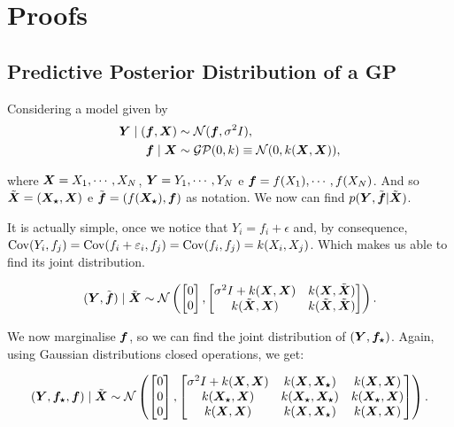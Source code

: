 \section{Proofs}
\label{proof:pred}

\subsection{Predictive Posterior Distribution of a GP}

Considering a model given by
    \begin{align*}
        \bfY \mid (\bff, \bfX) &\sim \cN(\bff, \sigma^2 I),\\
        \bff \mid \bfX &\sim \gp(0, k) \equiv \cN(0, k(\bfX, \bfX)), 
    \end{align*}

    where $\bfX = X_1, \cdots, X_N$, $\bfY =  Y_1, \cdots, Y_N$ e $\bff =  f(X_1), \cdots, f(X_N)$. And so $\tbX = (\Xst, \bfX) $ e $\tbf = (f(\Xst), \bff)$ as notation. We now can find $p(\bfY, \tbf|\tbX)$. 
    
    It is actually simple, once we notice that $Y_i = f_i + \epsilon$ and, by consequence, $\cov(Y_i, f_j) = \cov(f_i + \epsilon_i, f_j) = \cov(f_i,f_j) = k(X_i, X_j)$. Which makes us able to find its joint distribution.

    $$(\bfY, \tbf)\mid\tbX \sim \cN \left( 
    \begin{bmatrix}
        0\\0
    \end{bmatrix},
    \begin{bmatrix}
        \sigma^2I + k(\bfX, \bfX) & k(\bfX, \tbX)\\
        k(\tbX, \bfX) & k(\tbX, \tbX)\\
    \end{bmatrix}
    \right).$$

    We now marginalise $\bff$, so we can find the joint distribution of $(\bfY, \fst)$. Again, using Gaussian distributions closed operations, we get:

    $$(\bfY, \fst, \bff)\mid\tbX \sim \cN \left( 
    \begin{bmatrix}
        0\\0\\0
    \end{bmatrix},
    \begin{bmatrix}
        \sigma^2I + k(\bfX, \bfX) & k(\bfX, \Xst) & k(\bfX, \bfX)\\
        k(\Xst, \bfX) & k(\Xst, \Xst) & k(\Xst, \bfX)\\
        k(\bfX, \bfX) & k(\bfX, \Xst) & k(\bfX, \bfX)
    \end{bmatrix}
    \right).$$

